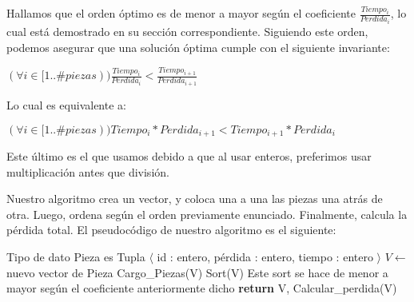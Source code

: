 Hallamos que el orden óptimo es de menor a mayor según el coeficiente $\frac{Tiempo_i}{Perdida_i}$, lo cual está demostrado en su sección correspondiente. Siguiendo este orden, podemos asegurar que una solución óptima cumple con el siguiente invariante:

\begin{center}

$(\forall i \in [1..\#{piezas})) \frac{Tiempo_i}{Perdida_i} < \frac{Tiempo_{i+1}}{Perdida_{i+1}}$
 
\end{center}

Lo cual es equivalente a:

\begin{center}

$(\forall i \in [1..\#{piezas})) Tiempo_i * Perdida_{i+1} < Tiempo_{i+1} * Perdida_i$
 
\end{center}

Este último es el que usamos debido a que al usar enteros, preferimos usar multiplicación antes que división.

Nuestro algoritmo crea un vector, y coloca una a una las piezas una atrás de otra. Luego, ordena según el orden previamente enunciado. Finalmente, calcula la pérdida total. El pseudocódigo de nuestro algoritmo es el siguiente:

\renewcommand{\algorithmiccomment}[1]{\hskip2em$//$ #1}

\begin{pseudo}
\State Tipo de dato Pieza es Tupla $\langle$ id : entero, pérdida : entero, tiempo : entero $\rangle$
        \State $V \leftarrow$ nuevo vector de Pieza %
        \State Cargo\_Piezas(V) %
        \State Sort(V) %
        \Comment Este sort se hace de menor a mayor según el coeficiente anteriormente dicho
        \State \textbf{return} V, Calcular\_perdida(V) %
    \EndProcedure
\end{pseudo}
